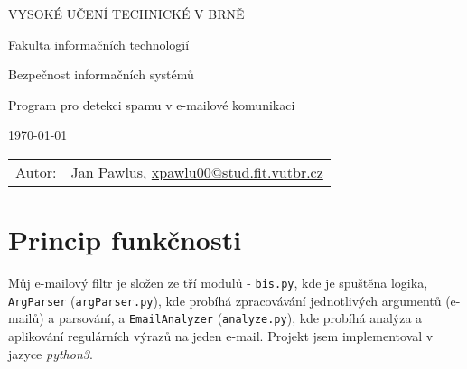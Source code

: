 \documentclass[12pt]{article}
\begin{document}
\begin{titlepage}

\begin{center}
\begin{LARGE}
VYSOKÉ UČENÍ TECHNICKÉ V BRNĚ \\


\end{LARGE}
\begin{Large}
Fakulta informačních technologií
\end{Large}
\end{center}

\vfill
\vspace{4cm}
\begin{center}
\begin{Large}
Bezpečnost informačních systémů \\
\end{Large}
\bigskip
\begin{Huge}
Program pro detekci spamu v e-mailové komunikaci\\
\end{Huge}
\end{center}

\vfill

\begin{center}
\begin{Large}
\today
\end{Large}
\end{center}

\vfill

\begin{flushleft}
\begin{large}
\begin{tabular}{ll}
Autor: & Jan Pawlus, \url{xpawlu00@stud.fit.vutbr.cz} \\ 
\end{tabular}
\end{large}
\end{flushleft}
\end{titlepage}

\newpage

\section{Princip funkčnosti} \pagestyle{myheadings}\setcounter{page}{1}

Můj e-mailový filtr je složen ze tří modulů - \verb|bis.py|, kde je spuštěna logika, \verb|ArgParser| (\verb|argParser.py|), kde probíhá zpracovávání jednotlivých argumentů (e-mailů) a parsování, a \verb|EmailAnalyzer| (\verb|analyze.py|), kde probíhá analýza a aplikování regulárních výrazů na jeden e-mail. Projekt jsem implementoval v jazyce \textit{python3}.
\end{document}

